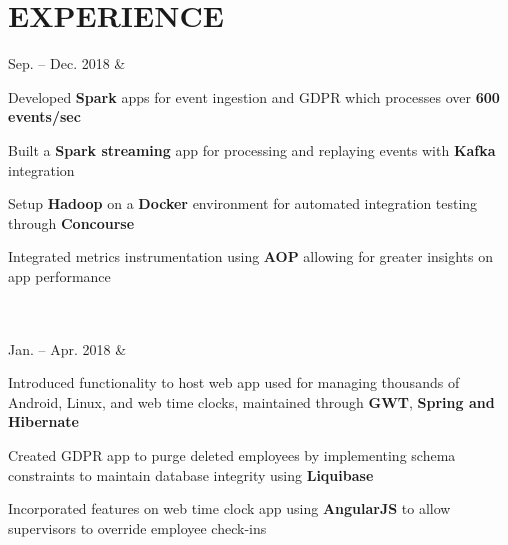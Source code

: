 \documentclass[]{richard-dang}
\begin{document}
\section*{\faGroup \hspace{\FAspace} EXPERIENCE}
\medbreak
\begin{tabularcv}
    Sep. – \newline 
    Dec. 2018   &  
                    \href{https://www.ultimatesoftware.com}{
                    }
                    \begin{tabitemize}
                        \item Developed \textbf{Spark} apps for event ingestion and GDPR which processes over \textbf{600 events/sec}
                        \item Built a \textbf{Spark streaming} app for processing and replaying events with \textbf{Kafka} integration
                        \item Setup \textbf{Hadoop} on a \textbf{Docker} environment for automated integration testing through \textbf{Concourse}
                        \item Integrated metrics instrumentation using \textbf{AOP} allowing for greater insights on app performance 
                    \end{tabitemize} 
                    \\[\vspacepar]\\[\vspacepar]
    Jan. – \newline 
    Apr. 2018   &  
                    \href{https://www.ultimatesoftware.com}{
                    }
                    \begin{tabitemize}
                        \item Introduced functionality to host web app used for managing thousands of Android, Linux, and web time clocks, maintained through \textbf{GWT}, \textbf{Spring and Hibernate}
                        \item Created GDPR app to purge deleted employees by implementing schema constraints to maintain database integrity using \textbf{Liquibase}
                        \item Incorporated features on web time clock app using \textbf{AngularJS} to allow supervisors to override employee check-ins
                    \end{tabitemize} 
                    \\[\vspacepar]\\[\vspacepar]

\end{tabularcv}
\end{document}
